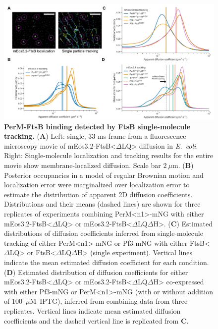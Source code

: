 \documentclass[twocolumn,pdflatex,sn-nature]{sn-jnl}%
\def\textsuperscript#1{<#1>}%
\newcommand\ec{\textit{E.~coli}}
\newcommand\ftsbdLQ{FtsB\textsuperscript{$\Delta{}$LQ}}
\newcommand\ftsbdLQdH{FtsB\textsuperscript{$\Delta{}$LQ$\Delta{}$H}}
\newcommand\permN{PerM\textsuperscript{n1}}
\begin{document}
\begin{figure}[htb]
    \centering
    \includegraphics[width=1.0\textwidth]{../figures/fig4.png}
    \caption{
        \textbf{PerM-FtsB binding detected by FtsB single-molecule tracking.}
        (\textbf{A}) Left: single, 33-ms frame from a fluorescence microscopy movie of mEos3.2-\ftsbdLQ{} diffusion in \ec{}. Right: Single-molecule localization and tracking results for the entire movie show membrane-localized diffusion. Scale bar $2~\mu$m.
        (\textbf{B}) Posterior occupancies in a model of regular Brownian motion and localization error were marginalized over localization error to estimate the distribution of apparent 2D diffusion coefficients. Distributions and their means (dashed lines) are shown for three replicates of experiments combining \permN{}-mNG with either mEos3.2-\ftsbdLQ{} or mEos3.2-\ftsbdLQdH{}.
        (\textbf{C}) Estimated distributions of diffusion coefficients inferred from single-molecule tracking of either \permN{}-mNG or Pf3-mNG with either \ftsbdLQ{} or \ftsbdLQdH{} (single experiment). Vertical lines indicate the mean estimated diffusion coefficient for each condition.
        (\textbf{D}) Estimated distribution of diffusion coefficients for either mEos3.2-\ftsbdLQ{} or mEos3.2-\ftsbdLQdH{} co-expressed with either Pf3-mNG or \permN{}-mNG (with or without addition of 100~$\mu$M~IPTG), inferred from combining data from three replicates. Vertical lines indicate mean estimated diffusion coefficients and the dashed vertical line is replicated from \textbf{C}.
    }\label{fig4}
\end{figure}
\end{document}

